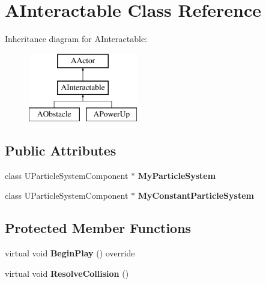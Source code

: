 \hypertarget{class_a_interactable}{}\section{A\+Interactable Class Reference}
\label{class_a_interactable}
Inheritance diagram for A\+Interactable\+:\begin{figure}[H]
\begin{center}
\leavevmode
\includegraphics[height=3.000000cm]{class_a_interactable}
\end{center}
\end{figure}
\subsection*{Public Attributes}
\begin{DoxyCompactItemize}
\item 
\mbox{\label{class_a_interactable_a3d2a5d5588e3f4eccdc46eb3713b8aa5}} 
class U\+Particle\+System\+Component $\ast$ {\bfseries My\+Particle\+System}
\item 
\mbox{\label{class_a_interactable_ae4a89c8a06832dfddc15258f63a20fd0}} 
class U\+Particle\+System\+Component $\ast$ {\bfseries My\+Constant\+Particle\+System}
\end{DoxyCompactItemize}
\subsection*{Protected Member Functions}
\begin{DoxyCompactItemize}
\item 
\mbox{\label{class_a_interactable_a8b71d8bae275d7f1aead02f0145a64eb}} 
virtual void {\bfseries Begin\+Play} () override
\item 
\mbox{\label{class_a_interactable_ae7841df055f81291b56b7f70c808fbb1}} 
virtual void {\bfseries Resolve\+Collision} ()
\end{DoxyCompactItemize}
